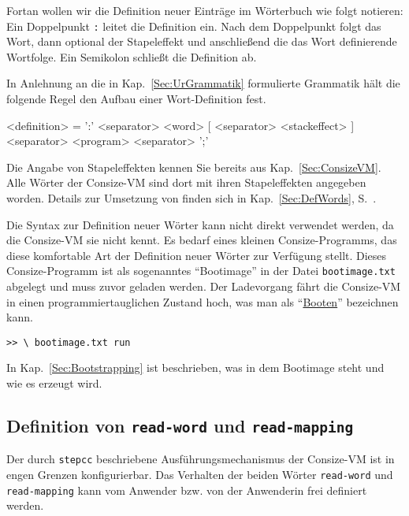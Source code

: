 Fortan wollen wir die Definition neuer Einträge im Wörterbuch wie folgt notieren: Ein Doppelpunkt \verb|:| leitet die Definition ein. Nach dem Doppelpunkt folgt das Wort, dann optional der Stapeleffekt und anschließend die das Wort definierende Wortfolge. Ein Semikolon schließt die Definition ab. 

In Anlehnung an die in Kap.~\ref{Sec:UrGrammatik} formulierte Grammatik hält die folgende Regel den Aufbau einer Wort-Definition fest.

\begin{grammar}
<definition> = ':' <separator> <word> [ <separator> <stackeffect> ] <separator> <program> <separator> ';'  
\end{grammar}

Die Angabe von Stapeleffekten kennen Sie bereits aus Kap.~\ref{Sec:ConsizeVM}. Alle Wörter der Consize-VM sind dort mit ihren Stapeleffekten angegeben worden. Details zur Umsetzung von  finden sich in Kap.~\ref{Sec:DefWords}, S.~\pageref{Sec:DefWords}.

Die Syntax zur Definition neuer Wörter kann nicht direkt verwendet werden, da die Consize-VM sie nicht kennt. Es bedarf eines kleinen Consize-Programms, das diese komfortable Art der Definition neuer Wörter zur Verfügung stellt. Dieses Consize-Programm ist als sogenanntes "`Bootimage"' in der Datei \verb|bootimage.txt| abgelegt und muss zuvor geladen werden. Der Ladevorgang fährt die Consize-VM in einen programmiertauglichen Zustand hoch, was man als "`\href{http://de.wikipedia.org/wiki/Booten}{Booten}"' bezeichnen kann.

\begin{verbatim}
>> \ bootimage.txt run
\end{verbatim}

In Kap.~\ref{Sec:Bootstrapping} ist beschrieben, was in dem Bootimage steht und wie es erzeugt wird.

\subsection{Definition von \texttt{read-word} und \texttt{read-mapping}}

Der durch \verb|stepcc| beschriebene Ausführungsmechanismus der Consize-VM ist in engen Grenzen konfigurierbar. Das Verhalten der beiden Wörter \verb|read-word| und \verb|read-mapping| kann vom Anwender bzw. von der Anwenderin frei definiert werden.

